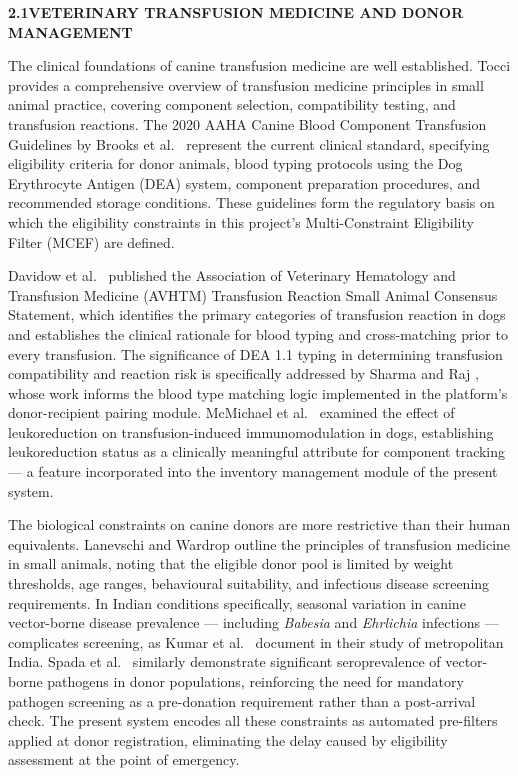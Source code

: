 \documentclass[12pt,a4paper]{article}
\begin{document}
\vspace{1.5em}
\noindent\textbf{2.1\quad VETERINARY TRANSFUSION MEDICINE AND DONOR MANAGEMENT}
\vspace{0.6em}

\noindent The clinical foundations of canine transfusion medicine are well established. Tocci \cite{tocci2009} provides a comprehensive overview of transfusion medicine principles in small animal practice, covering component selection, compatibility testing, and transfusion reactions. The 2020 AAHA Canine Blood Component Transfusion Guidelines by Brooks et al.\ \cite{brooks2020} represent the current clinical standard, specifying eligibility criteria for donor animals, blood typing protocols using the Dog Erythrocyte Antigen (DEA) system, component preparation procedures, and recommended storage conditions. These guidelines form the regulatory basis on which the eligibility constraints in this project's Multi-Constraint Eligibility Filter (MCEF) are defined.

\noindent Davidow et al.\ \cite{davidow2013} published the Association of Veterinary Hematology and Transfusion Medicine (AVHTM) Transfusion Reaction Small Animal Consensus Statement, which identifies the primary categories of transfusion reaction in dogs and establishes the clinical rationale for blood typing and cross-matching prior to every transfusion. The significance of DEA 1.1 typing in determining transfusion compatibility and reaction risk is specifically addressed by Sharma and Raj \cite{sharma2014}, whose work informs the blood type matching logic implemented in the platform's donor-recipient pairing module. McMichael et al.\ \cite{mcmichael2009} examined the effect of leukoreduction on transfusion-induced immunomodulation in dogs, establishing leukoreduction status as a clinically meaningful attribute for component tracking — a feature incorporated into the inventory management module of the present system.

\noindent The biological constraints on canine donors are more restrictive than their human equivalents. Lanevschi and Wardrop \cite{lanevschi2001} outline the principles of transfusion medicine in small animals, noting that the eligible donor pool is limited by weight thresholds, age ranges, behavioural suitability, and infectious disease screening requirements. In Indian conditions specifically, seasonal variation in canine vector-borne disease prevalence — including \textit{Babesia} and \textit{Ehrlichia} infections — complicates screening, as Kumar et al.\ \cite{kumar2022} document in their study of metropolitan India. Spada et al.\ \cite{spada2016} similarly demonstrate significant seroprevalence of vector-borne pathogens in donor populations, reinforcing the need for mandatory pathogen screening as a pre-donation requirement rather than a post-arrival check. The present system encodes all these constraints as automated pre-filters applied at donor registration, eliminating the delay caused by eligibility assessment at the point of emergency.
\end{document}
